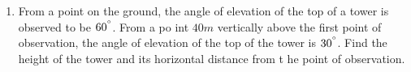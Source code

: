 \documentclass{article}                                         %
\begin{document}
                                                                                                                \begin{enumerate}
\item From a point on the ground, the angle of elevation of
     the top of a tower is observed to be $60^{\degree}$. From a po    int $40 m$ vertically above the first point of observation, the     angle of elevation of the top of the tower is $30^{\degree}$.     Find the height of the tower and its horizontal distance from t    he point of observation.
								\end{enumerate}                                                 
\end{document}
